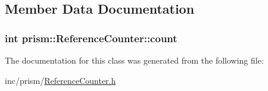 \subsection{Member Data Documentation}
\subsubsection[{\texorpdfstring{count}{count}}]{\setlength{\rightskip}{0pt plus 5cm}int prism\+::\+Reference\+Counter\+::count}\hypertarget{classprism_1_1_reference_counter_a18e28845491bc0d8632a4075c8f341a9}{}\label{classprism_1_1_reference_counter_a18e28845491bc0d8632a4075c8f341a9}


The documentation for this class was generated from the following file\+:\begin{DoxyCompactItemize}
\item 
inc/prism/\hyperlink{_reference_counter_8h}{Reference\+Counter.\+h}\end{DoxyCompactItemize}
